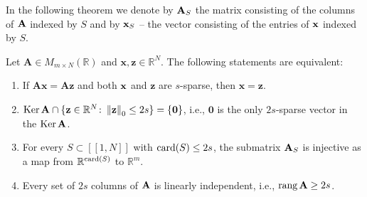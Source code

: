 In the following theorem we denote by $\mathbf{A}_S$ the matrix consisting of the columns of $\mathbf{A}$ indexed by $S$
and by $\mathbf{x}_S$ -- the vector consisting of the entries of $\mathbf{x}$ indexed by $S$.

\begin{theorem}
    Let $\mathbf{A} \in M_{m \times N}(\mathbb{R})$  and $\mathbf{x}, \mathbf{z} \in \mathbb{R}^N$.
    The following statements are equivalent:
    \begin{enumerate}[label=(\roman*)]
        \item \label{itm:itm1} If $\mathbf{Ax = Az}$ and both $\mathbf{x}$ and $\mathbf{z}$ are $s$-sparse, then $\mathbf{x = z}$.
        \item $\operatorname{Ker} \mathbf{A} \cap \{ \mathbf{z} \in \mathbb{R}^N \colon \left\Vert\mathbf{z}\right\Vert_0 \leq 2s \} = \{ \mathbf{0} \}$,
        i.e., $\mathbf{0}$ is the only $2s$-sparse vector in the $\operatorname{Ker} \mathbf{A}$.
        \item For every $S \subset [\![1,N]\!]$ with $\operatorname{card}(S) \leq 2s$, the submatrix $\mathbf{A}_S$ is injective as a
        map from $\mathbb{R}^{\operatorname{card}(S)}$ to $\mathbb{R}^m$.
        \item \label{itm:itm4} Every set of $2s$ columns of $\mathbf{A}$ is linearly independent, i.e., $\operatorname{rang} \mathbf{A} \geq 2s$.
    \end{enumerate}
\end{theorem}

